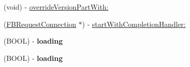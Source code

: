 \begin{DoxyCompactItemize}
\item 
(void) -\/ \hyperlink{interfaceFBRequest_a96f27df0edb3e41045bf5ba9ede2431c}{override\+Version\+Part\+With\+:}
\item 
(\hyperlink{interfaceFBRequestConnection}{F\+B\+Request\+Connection} $\ast$) -\/ \hyperlink{interfaceFBRequest_a40af16a9b68d4e08abd9e022b94df6f0}{start\+With\+Completion\+Handler\+:}
\item 
\mbox{\label{interfaceFBRequest_adf98c14f4021581a3d762d9c2fa29339}} 
(B\+O\+OL) -\/ {\bfseries loading}
\item 
\mbox{\label{interfaceFBRequest_adf98c14f4021581a3d762d9c2fa29339}} 
(B\+O\+OL) -\/ {\bfseries loading}
\end{DoxyCompactItemize}
